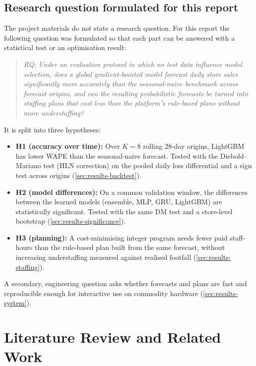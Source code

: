 \documentclass[conference]{IEEEtran}
\begin{document}
\subsection{Research question formulated for this report}
The project materials do not state a research question. For this report the following question was
formulated so that each part can be answered with a statistical test or an optimisation result:

\begin{quote}\itshape
RQ: Under an evaluation protocol in which no test data influence model selection, does a global
gradient-boosted model forecast daily store sales significantly more accurately than the
seasonal-naive benchmark across forecast origins, and can the resulting probabilistic forecasts be
turned into staffing plans that cost less than the platform's rule-based plans without more
understaffing?
\end{quote}

\noindent It is split into three hypotheses:
\begin{itemize}
\item \textbf{H1 (accuracy over time):} Over $K=8$ rolling 28-day origins, LightGBM has lower WAPE
  than the seasonal-naive forecast. Tested with the Diebold--Mariano test (HLN correction) on the
  pooled daily loss differential and a sign test across origins (\cref{sec:results-backtest}).
\item \textbf{H2 (model differences):} On a common validation window, the differences between the
  learned models (ensemble, MLP, GRU, LightGBM) are statistically significant. Tested with the same
  DM test and a store-level bootstrap (\cref{sec:results-significance}).
\item \textbf{H3 (planning):} A cost-minimising integer program needs fewer paid staff-hours than the
  rule-based plan built from the same forecast, without increasing understaffing measured against
  realised footfall (\cref{sec:results-staffing}).
\end{itemize}
A secondary, engineering question asks whether forecasts and plans are fast and reproducible enough
for interactive use on commodity hardware (\cref{sec:results-system}).

\section{Literature Review and Related Work}\label{sec:related}
\end{document}
